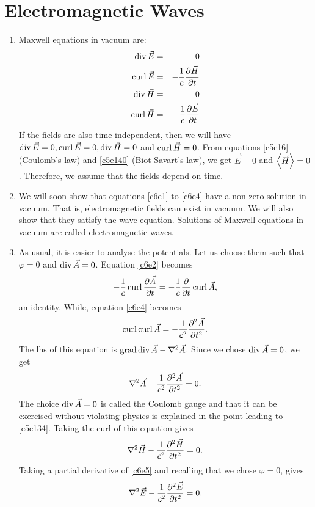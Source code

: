 \chapter{Electromagnetic Waves}\label{c6}
\begin{enumerate}
\item Maxwell equations in vacuum are:
\begin{eqnarray}
\operatorname{div}\vec{E} &=& 0 \label{c6e1} \\
\operatorname{curl}\vec{E} &=& -\frac{1}{c}\frac{\partial{\vec{H}}}{\partial{t}} \label{c6e2} \\
\operatorname{div}\vec{H} &=& 0 \label{c6e3} \\
\operatorname{curl}\vec{H} &=& \frac{1}{c}\frac{\partial{\vec{E}}}{\partial{t}} \label{c6e4}
\end{eqnarray}
If the fields are also time independent, then we will have $\operatorname{div}\vec{E} = 0,
\operatorname{curl}\vec{E} = 0, \operatorname{div}\vec{H} = 0$ and $\operatorname{curl}\vec{H} = 0$. From equations
\eqref{c5e16} (Coulomb's law) and \eqref{c5e140} (Biot-Savart's law), we get
$\vec{E} = 0$ and $\left\langle{\vec{H}}\right\rangle = 0$. Therefore, we assume that the fields depend
on time.

\item We will soon show that equations \eqref{c6e1} to \eqref{c6e4} have a
non-zero solution in vacuum. That is, electromagnetic fields can exist in vacuum.
We will also show that they satisfy the wave equation. Solutions of Maxwell
equations in vacuum are called electromagnetic waves.

\item As usual, it is easier to analyse the potentials. Let us choose them such
that $\varphi = 0$ and $\operatorname{div}\vec{A} = 0$. Equation \eqref{c6e2} becomes
\[
-\frac{1}{c}\operatorname{curl}\frac{\partial{\vec{A}}}{\partial{t}} = 
-\frac{1}{c}\frac{\partial}{\partial t}\operatorname{curl}\vec{A},
\]
an identity. While, equation \eqref{c6e4} becomes
\[
\operatorname{curl}\operatorname{curl}\vec{A} = -\frac{1}{c^2}\frac{\partial^2{\vec{A}}}{\partial{t}^2}.
\]
The lhs of this equation is $\operatorname{grad}\operatorname{div}\vec{A} - \nabla^2\vec{A}$. Since we chose
$\operatorname{div}{\vec{A}} = 0$, we get
\begin{equation}\label{c6e5}
\nabla^2\vec{A} - \frac{1}{c^2}\frac{\partial^2{\vec{A}}}{\partial{t}^2} = 0.
\end{equation}
The choice $\operatorname{div}{\vec{A}} = 0$ is called the Coulomb gauge and that it can be
exercised without violating physics is explained in the point leading to 
\eqref{c5e134}. Taking the curl of this equation gives
\begin{equation}\label{c6e6}
\nabla^2\vec{H} - \frac{1}{c^2}\frac{\partial^2{\vec{H}}}{\partial{t}^2} = 0.
\end{equation}
Taking a partial derivative of \eqref{c6e5} and recalling that we chose $\varphi
= 0$, gives
\begin{equation}\label{c6e7}
\nabla^2\vec{E} - \frac{1}{c^2}\frac{\partial^2{\vec{E}}}{\partial{t}^2} = 0.
\end{equation}


\end{enumerate}
